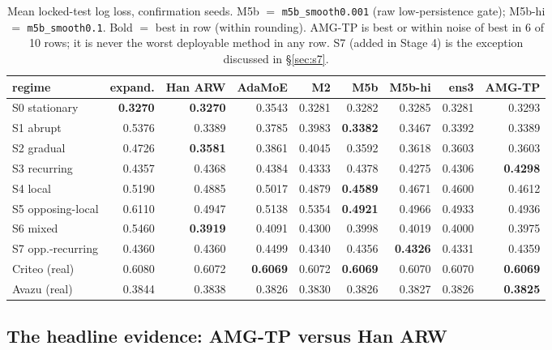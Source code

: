 \documentclass[11pt]{article}
\begin{document}
\begin{table}[H]
\centering
\footnotesize
\setlength{\tabcolsep}{4.2pt}
\begin{tabular}{@{}lrrrrrrrr@{}}
\toprule
regime & expand. & Han ARW & AdaMoE & M2 & M5b & M5b-hi & ens3 & \textbf{AMG-TP} \\
\midrule
S0 stationary      & \textbf{0.3270} & \textbf{0.3270} & 0.3543 & 0.3281 & 0.3282 & 0.3285 & 0.3281 & 0.3293 \\
S1 abrupt          & 0.5376 & 0.3389 & 0.3785 & 0.3983 & \textbf{0.3382} & 0.3467 & 0.3392 & 0.3389 \\
S2 gradual         & 0.4726 & \textbf{0.3581} & 0.3861 & 0.4045 & 0.3592 & 0.3618 & 0.3603 & 0.3603 \\
S3 recurring       & 0.4357 & 0.4368 & 0.4384 & 0.4333 & 0.4378 & 0.4275 & 0.4306 & \textbf{0.4298} \\
S4 local           & 0.5190 & 0.4885 & 0.5017 & 0.4879 & \textbf{0.4589} & 0.4671 & 0.4600 & 0.4612 \\
S5 opposing-local  & 0.6110 & 0.4947 & 0.5138 & 0.5354 & \textbf{0.4921} & 0.4966 & 0.4933 & 0.4936 \\
S6 mixed           & 0.5460 & \textbf{0.3919} & 0.4091 & 0.4300 & 0.3998 & 0.4019 & 0.4000 & 0.3975 \\
S7 opp.-recurring  & 0.4360 & 0.4360 & 0.4499 & 0.4340 & 0.4356 & \textbf{0.4326} & 0.4331 & 0.4359 \\
\midrule
Criteo (real)      & 0.6080 & 0.6072 & \textbf{0.6069} & 0.6072 & \textbf{0.6069} & 0.6070 & 0.6070 & \textbf{0.6069} \\
Avazu (real)       & 0.3844 & 0.3838 & 0.3826 & 0.3830 & 0.3826 & 0.3827 & 0.3826 & \textbf{0.3825} \\
\bottomrule
\end{tabular}
\caption{Mean locked-test log loss, confirmation seeds. M5b $=$
\texttt{m5b\_smooth0.001} (raw low-persistence gate); M5b-hi $=$
\texttt{m5b\_smooth0.1}. Bold $=$ best in row (within rounding). AMG-TP is
best or within noise of best in 6 of 10 rows; it is never the worst deployable
method in any row. S7 (added in Stage 4) is the exception discussed in
\S\ref{sec:s7}.}
\label{tab:headline}
\end{table}

\subsection{The headline evidence: AMG-TP versus Han ARW}
\end{document}
